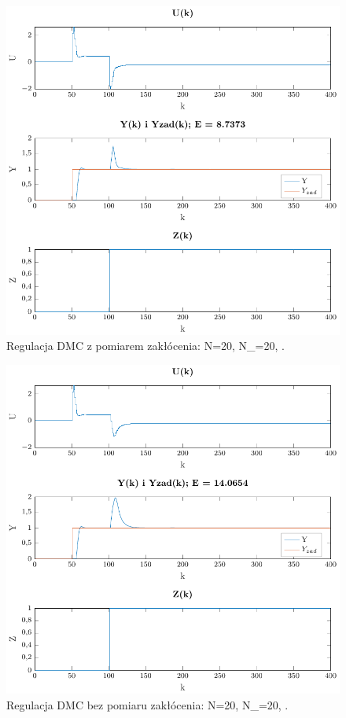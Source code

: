 \documentclass[a4paper,titlepage,11pt,twosides,floatssmall]{mwrep}
\begin{document}
\begin{figure}[H]
	\centering
	\includegraphics[scale=0.85]{../../Lab2/PDF_rysunki/Z5_DMCZZakloceniami.pdf}
	\caption{Regulacja DMC z pomiarem zakłócenia: N=20, N_{}=20, .}
	\label{pom_zak}
\end{figure}

\begin{figure}[H]
	\centering
	\includegraphics[scale=0.85]{../../Lab2/PDF_rysunki/Z5_DMCZZakloceniamiBezOdsprz.pdf}
	\caption{Regulacja DMC bez pomiaru zakłócenia: N=20, N_{}=20, .}
	\label{bez_pom_zak}
\end{figure}
\end{document}
